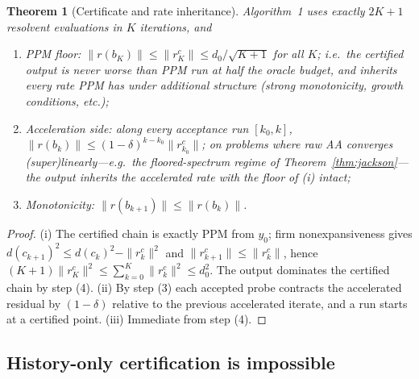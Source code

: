 \documentclass[11pt]{article}
\newtheorem{theorem}{Theorem}[section]
\theoremstyle{definition}
\theoremstyle{remark}
\newcommand{\norm}[1]{\| #1 \|}
\begin{document}
\begin{theorem}[Certificate and rate inheritance]\label{thm:cert}
Algorithm~1 uses exactly $2K+1$ resolvent evaluations in $K$ iterations, and
\begin{enumerate}[label=(\roman*)]
\item \emph{PPM floor}: $\norm{r(b_K)}\le\norm{r^c_K}\le
      d_0/\sqrt{K+1}$ for all $K$; i.e.\ the certified output is never
      worse than PPM run at half the oracle budget, and inherits every
      rate PPM has under additional structure (strong monotonicity,
      growth conditions, etc.);
\item \emph{Acceleration side}: along every acceptance run
      $[k_0,k]$, $\norm{r(b_k)}\le(1-\delta)^{k-k_0}\norm{r^c_{k_0}}$;
      on problems where raw AA converges (super)linearly---e.g.\ the
      floored-spectrum regime of Theorem~\ref{thm:jackson}---the output
      inherits the accelerated rate with the floor of (i) intact;
\item \emph{Monotonicity}: $\norm{r(b_{k+1})}\le\norm{r(b_k)}$.
\end{enumerate}
\end{theorem}
\begin{proof}
(i) The certified chain is exactly PPM from $y_0$; firm nonexpansiveness
gives $d(c_{k+1})^2\le d(c_k)^2-\norm{r^c_k}^2$ and
$\norm{r^c_{k+1}}\le\norm{r^c_k}$, hence
$(K+1)\norm{r^c_K}^2\le\sum_{k=0}^K\norm{r^c_k}^2\le d_0^2$. The output
dominates the certified chain by step (4). (ii) By step (3) each accepted
probe contracts the accelerated residual by $(1-\delta)$ relative to the
previous accelerated iterate, and a run starts at a certified point.
(iii) Immediate from step (4).
\end{proof}

\subsection{History-only certification is impossible}
\end{document}
